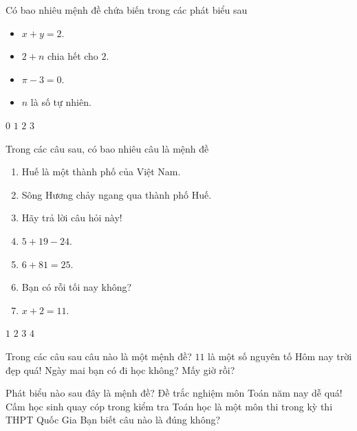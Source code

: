 \begin{ex}%
	Có bao nhiêu mệnh đề chứa biến trong các phát biểu sau
	\begin{itemize}
		\item $x+y=2$.
		\item $2+n$ chia hết cho $2$.
		\item $\pi -3 =0$.
		\item $n$ là số tự nhiên.
	\end{itemize}
	\choice
	{$0$}
	{$1$}
	{$2$}
	{\True $3$}
\end{ex}

\begin{ex}%
	Trong các câu sau, có bao nhiêu câu là mệnh đề
	\begin{enumerate}
		\item Huế là một thành phố của Việt Nam.
		\item Sông Hương chảy ngang qua thành phố Huế.
		\item Hãy trả lời câu hỏi này!
		\item $5+19-24$.
		\item $6+81=25$.
		\item Bạn có rỗi tối nay không?
		\item $x+2=11$.
	\end{enumerate}
	\choice
	{$1$}
	{$2$}
	{\True $3$}
	{$4$}
\end{ex}
\begin{ex}%
	Trong các câu sau câu nào là một mệnh đề?
	\choice
	{\True $11$ là một số nguyên tố}
	{Hôm nay trời đẹp quá!}
	{Ngày mai bạn có đi học không?}
	{Mấy giờ rồi?}
\end{ex}
\begin{ex}%
	Phát biểu nào sau đây là mệnh đề?
	\choice
	{Đề trắc nghiệm môn Toán năm nay dễ quá!}
	{Cấm học sinh quay cóp trong kiểm tra}
	{\True Toán học là một môn thi trong kỳ thi THPT Quốc Gia}
	{Bạn biết câu nào là đúng không?}
\end{ex}

